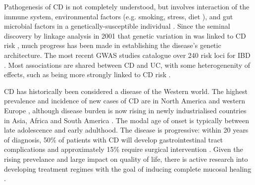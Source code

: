 Pathogenesis of \gls{CD} is not completely understood, but involves interaction of the immune system, environmental factors (e.g. smoking, stress, diet \autocite{ananthakrishnan2015EpidemiologyRiskFactors,roda2020CrohnDisease}), and gut microbial factors in a genetically-susceptible individual \autocite{desouza2016ImmunopathogenesisIBDCurrent}.
Since the seminal discovery by linkage analysis in 2001 that genetic variation in  was linked to \gls{CD} risk \autocite{todd2001TacklingCommonDisease},
much progress has been made in establishing the disease's genetic architecture.
The most recent \gls{GWAS} studies catalogue over 240 risk loci for \gls{IBD} \autocite{delange2017GenomewideAssociationStudy}.
Most associations are shared between \gls{CD} and \gls{UC}, with some heterogenenity of effects, such as  being more strongly linked to \gls{CD} risk \autocite{jostins2012HostMicrobeInteractions,liu2015AssociationAnalysesIdentify}.

\gls{CD} has historically been considered a disease of the Western world.
The highest prevalence and incidence of new cases of \gls{CD} are in North America and western Europe \autocite{roda2020CrohnDisease},
although disease burden is now rising in newly industrialised countries in Asia, Africa and South America \autocite{kaplan2015GlobalBurdenIBD,alatab2020GlobalRegionalNational}.
The modal age of onset is typically between late adolescence and early adulthood.
The disease is progressive: within 20 years of diagnosis, 50\% of patients with CD will develop gastrointestinal tract complications and approximately 15\% require surgical intervention \autocite{roda2020CrohnDisease}.
Given the rising prevelance and large impact on quality of life, there is active research into developing treatment regimes with the goal of inducing complete mucosal healing \autocite{levin2016MechanismActionAntiTNF,roda2020CrohnDisease}.

